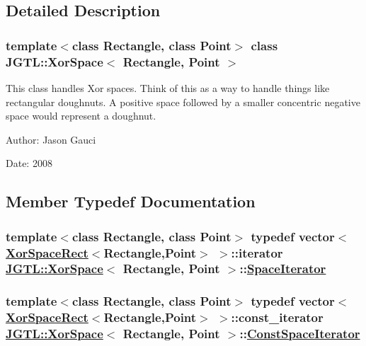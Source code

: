 \subsection{Detailed Description}
\subsubsection*{template$<$class Rectangle, class Point$>$ class JGTL::Xor\-Space$<$ Rectangle, Point $>$}

This class handles Xor spaces. Think of this as a way to handle things like rectangular doughnuts. A positive space followed by a smaller concentric negative space would represent a doughnut. 

\begin{Desc}
\item[Author:]Jason Gauci \end{Desc}
\begin{Desc}
\item[Date:]2008 \end{Desc}




\subsection{Member Typedef Documentation}
\hypertarget{class_j_g_t_l_1_1_xor_space_17c93bf8f2f8ec86efcc3e4a63e4a6ef}{
\subsubsection[SpaceIterator]{\setlength{\rightskip}{0pt plus 5cm}template$<$class Rectangle, class Point$>$ typedef vector$<$ \hyperlink{class_j_g_t_l_1_1_xor_space_rect}{Xor\-Space\-Rect}$<$Rectangle,Point$>$ $>$::iterator \hyperlink{class_j_g_t_l_1_1_xor_space}{JGTL::Xor\-Space}$<$ Rectangle, Point $>$::\hyperlink{class_j_g_t_l_1_1_xor_space_17c93bf8f2f8ec86efcc3e4a63e4a6ef}{Space\-Iterator}}}
\label{class_j_g_t_l_1_1_xor_space_17c93bf8f2f8ec86efcc3e4a63e4a6ef}


\hypertarget{class_j_g_t_l_1_1_xor_space_467518dcd95f1c3f009f59ad3ea5d8df}{
\subsubsection[ConstSpaceIterator]{\setlength{\rightskip}{0pt plus 5cm}template$<$class Rectangle, class Point$>$ typedef vector$<$ \hyperlink{class_j_g_t_l_1_1_xor_space_rect}{Xor\-Space\-Rect}$<$Rectangle,Point$>$ $>$::const\_\-iterator \hyperlink{class_j_g_t_l_1_1_xor_space}{JGTL::Xor\-Space}$<$ Rectangle, Point $>$::\hyperlink{class_j_g_t_l_1_1_xor_space_467518dcd95f1c3f009f59ad3ea5d8df}{Const\-Space\-Iterator}}}
\label{class_j_g_t_l_1_1_xor_space_467518dcd95f1c3f009f59ad3ea5d8df}





